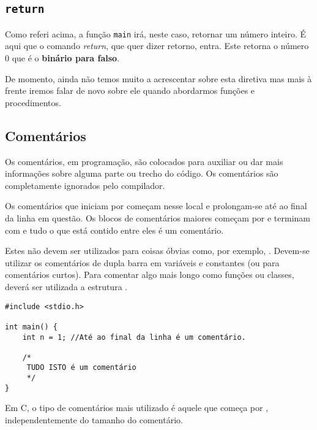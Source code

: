 \subsection{\texttt{return}}

Como referi acima, a função \texttt{main} irá, neste caso, retornar um número inteiro. É aqui que o comando \textit{return}, que quer dizer retorno, entra. Este retorna o número 0 que é o \textbf{binário para falso}.

De momento, ainda não temos muito a acrescentar sobre esta diretiva mas mais à frente iremos falar de novo sobre ele quando abordarmos funções e procedimentos.

\subsection{Comentários}

Os comentários, em programação, são colocados para auxiliar ou dar mais informações sobre alguma parte ou trecho do código. Os comentários são completamente ignorados pelo compilador.

Os comentários que iniciam por \quotes{//} começam nesse local e prolongam-se até ao final da linha em questão. Os blocos de comentários maiores começam por \quotes{/*} e terminam com \quotes{*/} e tudo o que está contido entre eles é um comentário.

Estes não devem ser utilizados para coisas óbvias como, por exemplo, . Devem-se utilizar os comentários de dupla barra em variáveis e constantes (ou para comentários curtos). Para comentar algo mais longo como funções ou classes, deverá ser utilizada a estrutura \quotes{*/}.

\begin{lstlisting}
#include <stdio.h>    
     
int main() {        
    int n = 1; //Até ao final da linha é um comentário.    
     
    /*  
     TUDO ISTO é um comentário            
     */   
}    
\end{lstlisting}

Em C, o tipo de comentários mais utilizado é aquele que começa por \quotes{/*}, independentemente do tamanho do comentário.
